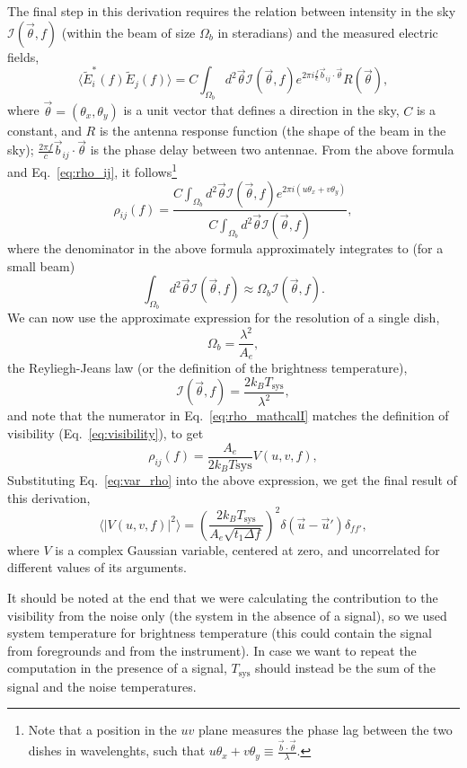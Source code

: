 \documentclass[12pt]{paper}
\newcommand{\beq}{\begin{equation}}
\newcommand{\eeq}{\end{equation}}
\begin{document}
The final step in this derivation requires the relation between intensity in the sky $\mathcal{I}(\vec\theta, f)$ (within the beam of size $\Omega_b$ in steradians) and the measured electric fields,
\beq
\langle \widetilde{E}_i^*(f)\widetilde{E}_j(f)\rangle = C \int_{\Omega_b} d^2\vec\theta\mathcal{I}(\vec\theta, f)e^{2\pi i\frac{ f}{c}\vec{b}_{ij}\cdot\vec{\theta}  }R(\vec\theta),
\label{eq:E_vs_mathcalI}
\eeq
where $\vec\theta=(\theta_x,\theta_y)$ is a unit vector that defines a direction in the sky, $C$ is a constant, and $R$ is the antenna response function (the shape of the beam in the sky); $\frac{2\pi f}{c}\vec{b}_{ij}\cdot\vec{\theta}$ is the phase delay between two antennae. From the above formula and Eq.~\ref{eq:rho_ij}, it follows\footnote{Note that a position in the $uv$ plane measures the phase lag between the two dishes in wavelenghts, such that $u\theta_x + v\theta_y\equiv\frac{\vec b\cdot \vec\theta}{\lambda}$.}
\beq
\rho_{ij}(f) = \frac{C\int_{\Omega_b}d^2\vec\theta\mathcal{I}(\vec\theta, f)e^{2\pi i(u\theta_x+v\theta_y)}}{C\int_{\Omega_b}d^2\vec\theta\mathcal{I}(\vec\theta, f)},
\label{eq:rho_mathcalI}
\eeq
where the denominator in the above formula approximately integrates to (for a small beam)
\beq
\int_{\Omega_b}d^2\vec\theta\mathcal{I}(\vec\theta, f) \approx
\Omega_b \mathcal{I}(\vec\theta, f).
\label{eq:rho_denominator}
\eeq
We can now use the approximate expression for the resolution of a single dish,
\beq
\Omega_b = \frac{\lambda^2}{A_e},
\label{eq:Omegab}
\eeq
the Reyliegh-Jeans law (or the definition of the brightness temperature),
\beq
\mathcal{I}(\vec\theta, f) = \frac{2k_BT_\text{sys}}{\lambda^2},
\label{eq:I_Tsys}
\eeq
and note that the numerator in Eq.~\ref{eq:rho_mathcalI} matches the definition of visibility (Eq.~\ref{eq:visibility}), to get 
\beq
\rho_{ij}(f) = \frac{A_e}{2k_BT\text{sys}}V(u,v,f),
\label{eq:rho_V}
\eeq
Substituting Eq.~\ref{eq:var_rho} into the above expression, we get the final result of this derivation,
\beq
\langle|V(u,v,f)|^2\rangle = \left(\frac{2k_BT_\text{sys}}{A_e\sqrt{t_1\Delta f}}\right)^2\delta(\vec{u}-\vec{u}')\delta_{ff'},
\label{eq:Vrms_final}
\eeq
where $V$ is a complex Gaussian variable, centered at zero, and uncorrelated for different values of its arguments.

It should be noted at the end that we were calculating the contribution to the visibility from the noise only (the system in the absence of a signal), so we used system temperature for brightness temperature (this could contain the signal from foregrounds and from the instrument). In case we want to repeat the computation in the presence of a signal, $T_\text{sys}$ should instead be the sum of the signal and the noise temperatures.
\end{document}
